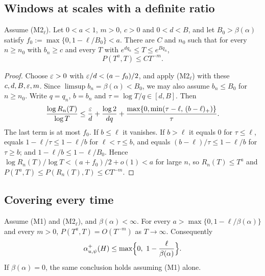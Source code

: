 \subsection{Windows at scales with a definite ratio}

\begin{proposition}\label{prop:selected}
Assume (M2$_\ell$). Let $0<a<1$, $m>0$, $c>0$ and $0<d<B$, and let $B_0>\beta(\alpha)$ satisfy $f_0:=\max\{0,1-\ell/B_0\}<a$. There are $C$ and $n_0$ such that for every $n\ge n_0$ with $b_n\ge c$ and every $T$ with $e^{dq_n}\le T\le e^{Bq_n}$,
\[
P(T^a,T)\le CT^{-m}.
\]
\end{proposition}

\begin{proof}
Choose $\varepsilon>0$ with $\varepsilon/d<(a-f_0)/2$, and apply (M2$_\ell$) with these $c,d,B,\varepsilon,m$. Since $\limsup b_n=\beta(\alpha)<B_0$, we may also assume $b_n\le B_0$ for $n\ge n_0$. Write $q=q_n$, $b=b_n$ and $\tau=\log T/q\in[d,B]$. Then
\[
\frac{\log R_n(T)}{\log T}\le\frac{\varepsilon}{d}+\frac{\log2}{dq}+\frac{\max\{0,\min(\tau-\ell,\,(b-\ell)_+)\}}{\tau}.
\]
The last term is at most $f_0$. If $b\le\ell$ it vanishes. If $b>\ell$ it equals $0$ for $\tau\le\ell$, equals $1-\ell/\tau\le1-\ell/b$ for $\ell<\tau\le b$, and equals $(b-\ell)/\tau\le1-\ell/b$ for $\tau\ge b$; and $1-\ell/b\le1-\ell/B_0$. Hence $\log R_n(T)/\log T<(a+f_0)/2+o(1)<a$ for large $n$, so $R_n(T)\le T^a$ and $P(T^a,T)\le P(R_n(T),T)\le CT^{-m}$.
\end{proof}

\subsection{Covering every time}

\begin{theorem}[Covering]\label{thm:covering}
Assume (M1) and (M2$_\ell$), and $\beta(\alpha)<\infty$. For every $a>\max\{0,1-\ell/\beta(\alpha)\}$ and every $m>0$, $P(T^a,T)=O(T^{-m})$ as $T\to\infty$. Consequently
\[
\alpha^+_{u,\psi}(H)\le\max\Bigl\{0,\ 1-\frac{\ell}{\beta(\alpha)}\Bigr\}.
\]
If $\beta(\alpha)=0$, the same conclusion holds assuming (M1) alone.
\end{theorem}

